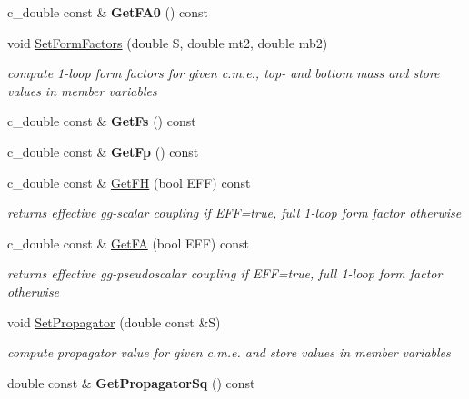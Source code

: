 \begin{DoxyCompactItemize}
\item 
\hypertarget{classHiggsBoson_a2be84efb1f350882309f74db3dcc32a5}{c\-\_\-double const \& {\bfseries Get\-F\-A0} () const }\label{classHiggsBoson_a2be84efb1f350882309f74db3dcc32a5}

\item 
void \hyperlink{classHiggsBoson_ad0480bb1b045dfe4e7d871dff8ff6265}{Set\-Form\-Factors} (double S, double mt2, double mb2)
\begin{DoxyCompactList}\small\item\em compute 1-\/loop form factors for given c.\-m.\-e., top-\/ and bottom mass and store values in member variables \end{DoxyCompactList}\item 
\hypertarget{classHiggsBoson_a6e3be51e54f71ad1681485d463ba54f9}{c\-\_\-double const \& {\bfseries Get\-Fs} () const }\label{classHiggsBoson_a6e3be51e54f71ad1681485d463ba54f9}

\item 
\hypertarget{classHiggsBoson_a404990102de3ee3cd1f65a53f0759d76}{c\-\_\-double const \& {\bfseries Get\-Fp} () const }\label{classHiggsBoson_a404990102de3ee3cd1f65a53f0759d76}

\item 
\hypertarget{classHiggsBoson_af9055e140206943efe94b55ea76c1632}{c\-\_\-double const \& \hyperlink{classHiggsBoson_af9055e140206943efe94b55ea76c1632}{Get\-F\-H} (bool E\-F\-F) const }\label{classHiggsBoson_af9055e140206943efe94b55ea76c1632}

\begin{DoxyCompactList}\small\item\em returns effective gg-\/scalar coupling if E\-F\-F=true, full 1-\/loop form factor otherwise \end{DoxyCompactList}\item 
\hypertarget{classHiggsBoson_a8af3de930fb155b566956ab7c0457e29}{c\-\_\-double const \& \hyperlink{classHiggsBoson_a8af3de930fb155b566956ab7c0457e29}{Get\-F\-A} (bool E\-F\-F) const }\label{classHiggsBoson_a8af3de930fb155b566956ab7c0457e29}

\begin{DoxyCompactList}\small\item\em returns effective gg-\/pseudoscalar coupling if E\-F\-F=true, full 1-\/loop form factor otherwise \end{DoxyCompactList}\item 
void \hyperlink{classHiggsBoson_aea2f63913f070158dda0693c60f3c860}{Set\-Propagator} (double const \&S)
\begin{DoxyCompactList}\small\item\em compute propagator value for given c.\-m.\-e. and store values in member variables \end{DoxyCompactList}\item 
\hypertarget{classHiggsBoson_a3b836f00cee69f41cd04dd61e86bc4ab}{double const \& {\bfseries Get\-Propagator\-Sq} () const }\label{classHiggsBoson_a3b836f00cee69f41cd04dd61e86bc4ab}


\end{DoxyCompactItemize}
